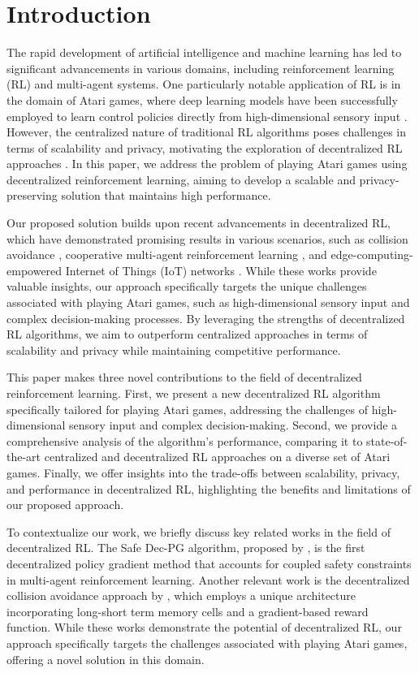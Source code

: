 \section{Introduction}

The rapid development of artificial intelligence and machine learning has led to significant advancements in various domains, including reinforcement learning (RL) and multi-agent systems. One particularly notable application of RL is in the domain of Atari games, where deep learning models have been successfully employed to learn control policies directly from high-dimensional sensory input \citep{mnih2013playing}. However, the centralized nature of traditional RL algorithms poses challenges in terms of scalability and privacy, motivating the exploration of decentralized RL approaches \citep{liu2022federated}. In this paper, we address the problem of playing Atari games using decentralized reinforcement learning, aiming to develop a scalable and privacy-preserving solution that maintains high performance.

Our proposed solution builds upon recent advancements in decentralized RL, which have demonstrated promising results in various scenarios, such as collision avoidance \citep{thumiger2022a}, cooperative multi-agent reinforcement learning \citep{su2022ma2ql}, and edge-computing-empowered Internet of Things (IoT) networks \citep{lei2022adaptive}. While these works provide valuable insights, our approach specifically targets the unique challenges associated with playing Atari games, such as high-dimensional sensory input and complex decision-making processes. By leveraging the strengths of decentralized RL algorithms, we aim to outperform centralized approaches in terms of scalability and privacy while maintaining competitive performance.

This paper makes three novel contributions to the field of decentralized reinforcement learning. First, we present a new decentralized RL algorithm specifically tailored for playing Atari games, addressing the challenges of high-dimensional sensory input and complex decision-making. Second, we provide a comprehensive analysis of the algorithm's performance, comparing it to state-of-the-art centralized and decentralized RL approaches on a diverse set of Atari games. Finally, we offer insights into the trade-offs between scalability, privacy, and performance in decentralized RL, highlighting the benefits and limitations of our proposed approach.

To contextualize our work, we briefly discuss key related works in the field of decentralized RL. The Safe Dec-PG algorithm, proposed by \citet{lu2021decentralized}, is the first decentralized policy gradient method that accounts for coupled safety constraints in multi-agent reinforcement learning. Another relevant work is the decentralized collision avoidance approach by \citet{thumiger2022a}, which employs a unique architecture incorporating long-short term memory cells and a gradient-based reward function. While these works demonstrate the potential of decentralized RL, our approach specifically targets the challenges associated with playing Atari games, offering a novel solution in this domain.

